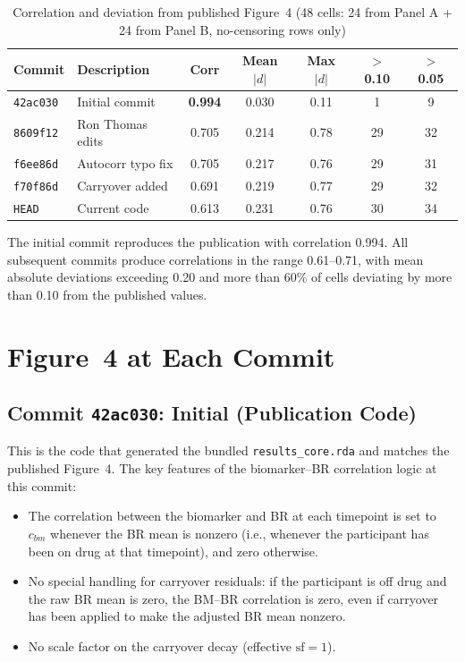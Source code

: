 \documentclass[11pt]{article}
\begin{document}
\begin{table}[h]
\centering
\caption{Correlation and deviation from published Figure~4
  (48 cells: 24 from Panel A + 24 from Panel B, no-censoring
  rows only)}
\begin{tabular}{llccccc}
\toprule
Commit & Description & Corr & Mean $|d|$ & Max $|d|$
  & $>$0.10 & $>$0.05 \\
\midrule
\texttt{42ac030} & Initial commit
  & \textbf{0.994} & 0.030 & 0.11 & 1 & 9 \\
\texttt{8609f12} & Ron Thomas edits
  & 0.705 & 0.214 & 0.78 & 29 & 32 \\
\texttt{f6ee86d} & Autocorr typo fix
  & 0.705 & 0.217 & 0.76 & 29 & 31 \\
\texttt{f70f86d} & Carryover added
  & 0.691 & 0.219 & 0.77 & 29 & 32 \\
\texttt{HEAD} & Current code
  & 0.613 & 0.231 & 0.76 & 30 & 34 \\
\bottomrule
\end{tabular}
\label{tab:summary}
\end{table}

The initial commit reproduces the publication with correlation
0.994. All subsequent commits produce correlations in the range
0.61--0.71, with mean absolute deviations exceeding 0.20 and
more than 60\% of cells deviating by more than 0.10 from the
published values.

\section{Figure~4 at Each Commit}

\subsection{Commit \texttt{42ac030}: Initial (Publication Code)}

This is the code that generated the bundled
\texttt{results\_core.rda} and matches the published Figure~4.
The key features of the biomarker--BR correlation logic at this
commit:

\begin{itemize}
\item The correlation between the biomarker and BR at each
  timepoint is set to $c_{bm}$ whenever the BR mean is nonzero
  (i.e., whenever the participant has been on drug at that
  timepoint), and zero otherwise.
\item No special handling for carryover residuals: if the
  participant is off drug and the raw BR mean is zero, the
  BM--BR correlation is zero, even if carryover has been applied
  to make the adjusted BR mean nonzero.
\item No scale factor on the carryover decay (effective
  $\text{sf} = 1$).
\end{itemize}
\end{document}
